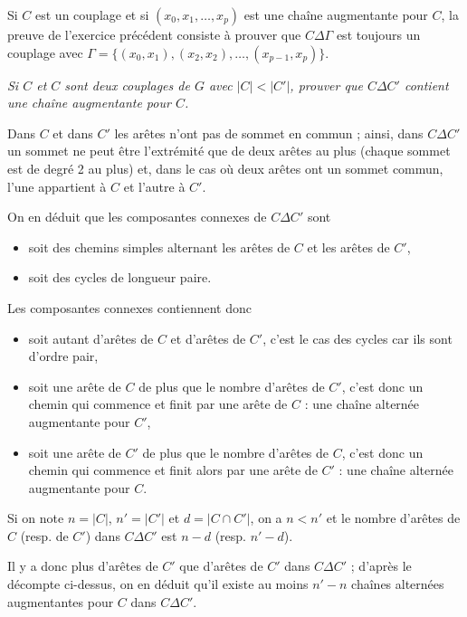 Si $C$ est un couplage et si $(x_0,x_1,\ldots,x_p)$ est une chaîne augmentante pour $C$, la preuve de l'exercice précédent consiste à prouver que $C \Delta \Gamma$ est toujours un couplage avec $\Gamma = \bigl\{(x_0, x_1), (x_2, x_2), \ldots, (x_{p-1}, x_p)\bigr\}$.
\begin{Exercise}[title=Existence de chaînes augmentantes]\it 
Si $C$ et $C$ sont deux couplages de $G$ avec $|C| < |C'|$, prouver que $C \Delta C'$ contient une chaîne augmentante pour $C$.
\end{Exercise}
\begin{Answer}
Dans $C$ et dans $C'$ les arêtes n'ont pas de sommet en commun ; ainsi, dans $C \Delta C'$ un sommet ne peut être l'extrémité que de deux arêtes au plus (chaque sommet est de degré 2 au plus) et, dans le cas où deux arêtes ont un sommet commun, l'une appartient à $C$ et l'autre à $C'$.

On en déduit que les composantes connexes de $C \Delta C'$ sont
\begin{itemize}
    \item soit des chemins simples alternant les arêtes de $C$ et les arêtes de $C'$,
    \item soit des cycles de longueur paire.
\end{itemize}

\newpage

Les composantes connexes contiennent donc
\begin{itemize}
    \item soit autant d'arêtes de $C$ et d'arêtes de $C'$, c'est le cas des cycles car ils sont d'ordre pair,
    \item soit une arête de $C$ de plus que le nombre d'arêtes de $C'$, c'est donc un chemin qui commence et finit par une arête de $C$ : une chaîne alternée augmentante pour $C'$, 
    \item soit une arête de $C'$ de plus que le nombre d'arêtes de $C$, c'est donc un chemin qui commence et finit alors par une arête de $C'$ : une chaîne alternée augmentante pour $C$.
\end{itemize}


Si on note $n = |C|$, $n' = |C'|$ et $d = |C \cap C'|$, on a $n < n'$ et le nombre d'arêtes de $C$ (resp. de $C'$) dans $C \Delta C'$ est $n-d$ (resp. $n'-d$).

Il y a donc plus d'arêtes de $C'$ que d'arêtes de $C'$ dans $C \Delta C'$ ; d'après le décompte ci-dessus, on en déduit qu'il existe au moins $n'-n$ chaînes alternées augmentantes pour $C$ dans $C\Delta C'$.
\end{Answer}
